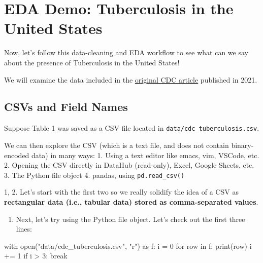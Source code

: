 \documentclass[
  letterpaper,
  DIV=11,
  numbers=noendperiod]{scrreprt}
\newenvironment{Shaded}{\begin{snugshade}}{\end{snugshade}}
\newcommand{\BuiltInTok}[1]{\textcolor[rgb]{0.00,0.23,0.31}{#1}}
\newcommand{\ControlFlowTok}[1]{\textcolor[rgb]{0.00,0.23,0.31}{#1}}
\newcommand{\DecValTok}[1]{\textcolor[rgb]{0.68,0.00,0.00}{#1}}
\newcommand{\ImportTok}[1]{\textcolor[rgb]{0.00,0.46,0.62}{#1}}
\newcommand{\KeywordTok}[1]{\textcolor[rgb]{0.00,0.23,0.31}{#1}}
\newcommand{\NormalTok}[1]{\textcolor[rgb]{0.00,0.23,0.31}{#1}}
\newcommand{\OperatorTok}[1]{\textcolor[rgb]{0.37,0.37,0.37}{#1}}
\newcommand{\StringTok}[1]{\textcolor[rgb]{0.13,0.47,0.30}{#1}}
\providecommand{\tightlist}{%
  \setlength{\itemsep}{0pt}\setlength{\parskip}{0pt}}\usepackage{longtable,booktabs,array}
\begin{document}

\hypertarget{eda-demo-tuberculosis-in-the-united-states}{%
\chapter{EDA Demo: Tuberculosis in the United
States}\label{eda-demo-tuberculosis-in-the-united-states}}

Now, let's follow this data-cleaning and EDA workflow to see what can we
say about the presence of Tuberculosis in the United States!

We will examine the data included in the
\href{https://www.cdc.gov/mmwr/volumes/71/wr/mm7112a1.htm?s_cid=mm7112a1_w\#T1_down}{original
CDC article} published in 2021.

\hypertarget{csvs-and-field-names}{%
\section{CSVs and Field Names}\label{csvs-and-field-names}}

Suppose Table 1 was saved as a CSV file located in
\texttt{data/cdc\_tuberculosis.csv}.

We can then explore the CSV (which is a text file, and does not contain
binary-encoded data) in many ways: 1. Using a text editor like emacs,
vim, VSCode, etc. 2. Opening the CSV directly in DataHub (read-only),
Excel, Google Sheets, etc. 3. The Python file object 4. pandas, using
\texttt{pd.read\_csv()}

1, 2. Let's start with the first two so we really solidify the idea of a
CSV as \textbf{rectangular data (i.e., tabular data) stored as
comma-separated values}.

\begin{enumerate}
\def\labelenumi{\arabic{enumi}.}
\setcounter{enumi}{2}
\tightlist
\item
  Next, let's try using the Python file object. Let's check out the
  first three lines:
\end{enumerate}

\begin{Shaded}
\begin{Highlighting}[]
\ControlFlowTok{with} \BuiltInTok{open}\NormalTok{(}\StringTok{"data/cdc\_tuberculosis.csv"}\NormalTok{, }\StringTok{"r"}\NormalTok{) }\ImportTok{as}\NormalTok{ f:}
\NormalTok{    i }\OperatorTok{=} \DecValTok{0}
    \ControlFlowTok{for}\NormalTok{ row }\KeywordTok{in}\NormalTok{ f:}
        \BuiltInTok{print}\NormalTok{(row)}
\NormalTok{        i }\OperatorTok{+=} \DecValTok{1}
        \ControlFlowTok{if}\NormalTok{ i }\OperatorTok{\textgreater{}} \DecValTok{3}\NormalTok{:}
            \ControlFlowTok{break}
\end{Highlighting}
\end{Shaded}
\end{document}
